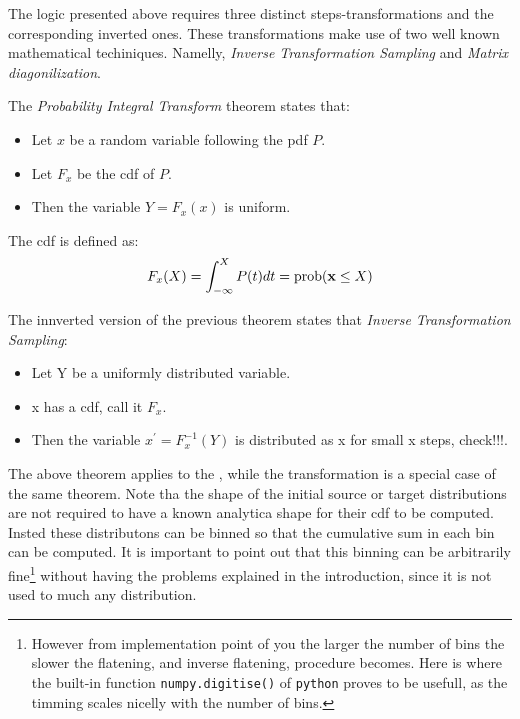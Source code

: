 The logic presented above requires three distinct steps-transformations and the corresponding
inverted ones. These transformations make use of two well known mathematical techiniques.
Namelly, { \it Inverse Transformation Sampling} and {\it Matrix diagonilization}.

\noindent The {\it Probability Integral Transform} theorem states that:
\begin{center}
\begin{itemize}
\item Let $x$ be a random variable following the pdf $P$.
\item Let $F_x$ be the cdf of $P$.
\item Then the variable $Y=F_x(x)$ is uniform.
\end{itemize}
\end{center}

\noindent The cdf is defined as:
\begin{equation}
F_x(X) = \int_{-\infty}^X P(t)dt  = \text{prob}({\bf x} \leq X) \nonumber
\end{equation}

\noindent The innverted version of the previous theorem states that {\it Inverse Transformation Sampling}:
\begin{center}
\begin{itemize}
\item Let Y be a uniformly distributed variable.
\item x has a cdf, call it $F_x$.
\item Then the variable $x^\prime = F_x^{-1}(Y)$ is distributed as x {\color{red} for small x steps, check!!!}.
\end{itemize}
\end{center}

\noindent The above theorem applies to the \gFlat{}, while the transformation \gGaus{} is
a special case of the same theorem. Note tha the shape of the initial source or target distributions are
not required to have a known analytica shape for their cdf to be computed. Insted these distributons can
be binned so that the cumulative sum in each bin can be computed. It is important to point out that this
binning can be arbitrarily fine\footnote{However from implementation point of you the larger the number of
bins the slower the flatening, and inverse flatening, procedure becomes. Here is where the built-in function
{\tt numpy.digitise()} of {\tt python} proves to be usefull, as the timming scales nicelly with the number of bins.}
without having the problems explained in the introduction, since it is not used to much any distribution.

